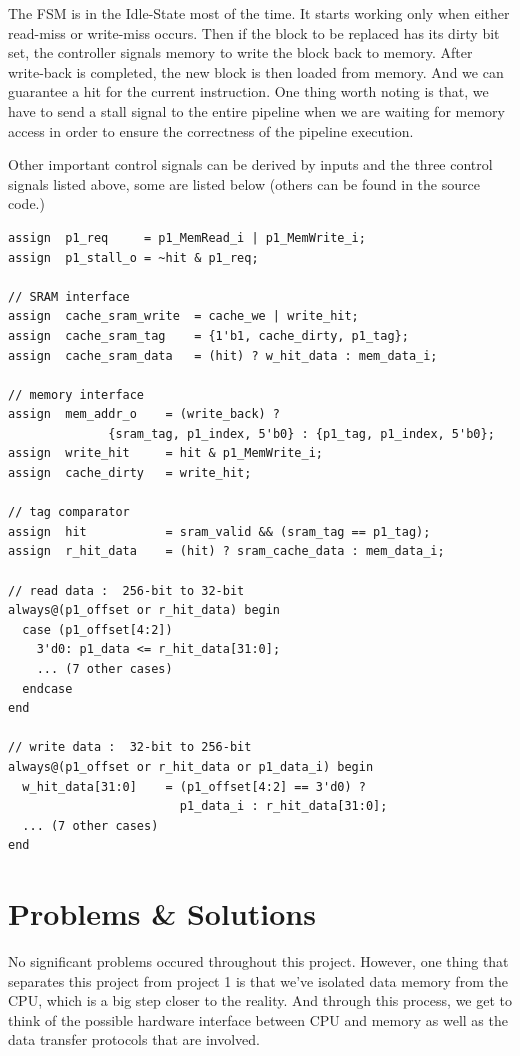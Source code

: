 The FSM is in the Idle-State most of the time. It starts working only when either read-miss or write-miss occurs. Then if the block to be replaced has its dirty bit set, the controller signals memory to write the block back to memory. After write-back is completed, the new block is then loaded from memory. And we can guarantee a hit for the current instruction. One thing worth noting is that, we have to send a stall signal to the entire pipeline when we are waiting for memory access in order to ensure the correctness of the pipeline execution.

Other important control signals can be derived by inputs and the three control signals listed above, some are listed below (others can be found in the source code.)

\begin{lstlisting}
assign  p1_req     = p1_MemRead_i | p1_MemWrite_i;
assign  p1_stall_o = ~hit & p1_req;

// SRAM interface
assign  cache_sram_write  = cache_we | write_hit;
assign  cache_sram_tag    = {1'b1, cache_dirty, p1_tag};
assign  cache_sram_data   = (hit) ? w_hit_data : mem_data_i;

// memory interface
assign  mem_addr_o    = (write_back) ?
              {sram_tag, p1_index, 5'b0} : {p1_tag, p1_index, 5'b0};
assign  write_hit     = hit & p1_MemWrite_i;
assign  cache_dirty   = write_hit;

// tag comparator
assign  hit           = sram_valid && (sram_tag == p1_tag);
assign  r_hit_data    = (hit) ? sram_cache_data : mem_data_i;

// read data :  256-bit to 32-bit
always@(p1_offset or r_hit_data) begin
  case (p1_offset[4:2])
    3'd0: p1_data <= r_hit_data[31:0];
    ... (7 other cases)
  endcase
end

// write data :  32-bit to 256-bit
always@(p1_offset or r_hit_data or p1_data_i) begin
  w_hit_data[31:0]    = (p1_offset[4:2] == 3'd0) ?
                        p1_data_i : r_hit_data[31:0];
  ... (7 other cases)
end
\end{lstlisting}

\section{Problems \& Solutions}
No significant problems occured throughout this project. However, one thing that separates this project from project 1 is that we've isolated data memory from the CPU, which is a big step closer to the reality. And through this process, we get to think of the possible hardware interface between CPU and memory as well as the data transfer protocols that are involved.
